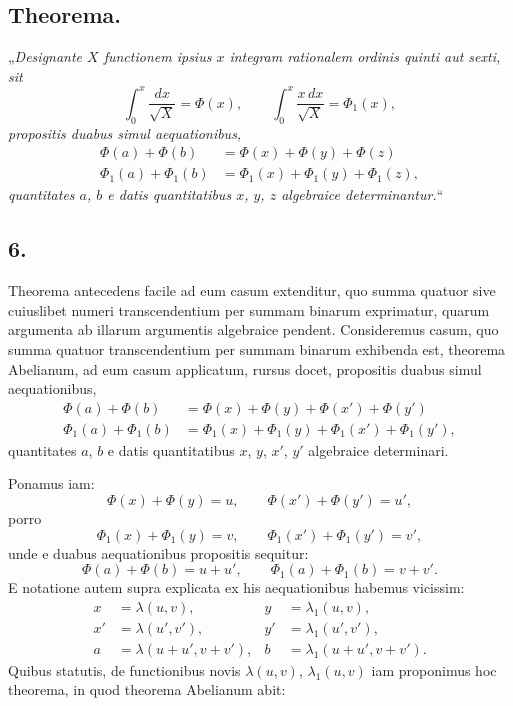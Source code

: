 \documentclass{article}
\begin{document}
\subsection*{Theorema.}

„\emph{Designante $X$ functionem ipsius $x$ integram rationalem ordinis quinti aut sexti, sit}
\[ \int_0^{x} \frac{dx}{\sqrt{X}} = \Phi(x), \qquad \int_0^{x} \frac{x\,dx}{\sqrt{X}} = \Phi_1(x), \]
\emph{propositis duabus simul aequationibus,}
\[ \begin{aligned} \Phi(a) + \Phi(b) &= \Phi(x) + \Phi(y) + \Phi(z) \\ \Phi_1(a) + \Phi_1(b) &= \Phi_1(x) + \Phi_1(y) + \Phi_1(z), \end{aligned} \]
\emph{quantitates $a$, $b$ e datis quantitatibus $x$, $y$, $z$ algebraice determinantur.}“

\subsection*{6.}

Theorema antecedens facile ad eum casum extenditur, quo summa quatuor sive cuiuslibet numeri transcendentium per summam binarum exprimatur, quarum argumenta ab illarum argumentis algebraice pendent. Consideremus casum, quo summa quatuor transcendentium per summam binarum exhibenda est, theorema Abelianum, ad eum casum applicatum, rursus docet, propositis duabus simul aequationibus,
\[ \begin{aligned} \Phi(a) + \Phi(b) &= \Phi(x) + \Phi(y) + \Phi(x') + \Phi(y') \\ \Phi_1(a) + \Phi_1(b) &= \Phi_1(x) + \Phi_1(y) + \Phi_1(x') + \Phi_1(y'), \end{aligned} \]
quantitates $a$, $b$ e datis quantitatibus $x$, $y$, $x'$, $y'$ algebraice determinari.

Ponamus iam:
\[ \Phi(x) + \Phi(y) = u, \qquad \Phi(x') + \Phi(y') = u', \]
porro
\[ \Phi_1(x) + \Phi_1(y) = v, \qquad \Phi_1(x') + \Phi_1(y') = v', \]
unde e duabus aequationibus propositis sequitur:
\[ \Phi(a) + \Phi(b) = u + u', \qquad \Phi_1(a) + \Phi_1(b) = v + v'. \]
E notatione autem supra explicata ex his aequationibus habemus vicissim:
\[ \begin{aligned} x &= \lambda(u,v), & y &= \lambda_1(u,v), \\ x' &= \lambda(u',v'), & y' &= \lambda_1(u',v'), \\ a &= \lambda(u+u', v+v'), & b &= \lambda_1(u+u', v+v'). \end{aligned} \]
Quibus statutis, de functionibus novis $\lambda(u,v)$, $\lambda_1(u,v)$ iam proponimus hoc theorema, in quod theorema Abelianum abit:
\end{document}
